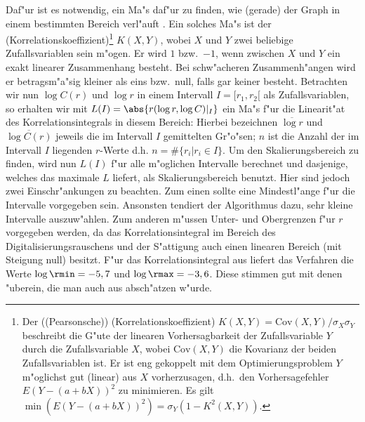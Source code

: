 Daf"ur ist es notwendig, ein Ma"s daf"ur zu finden, wie \naja(gerade) der Graph in einem
bestimmten Bereich verl"auft \cite{Raidl}. Ein solches Ma"s ist der 
\begriff(Korrelationskoeffizient)\footnote{Der (\begriff(Pearsonsche))
\begriff(Korrelationskoeffizient) $K(X,Y)=\mathrm{Cov}(X,Y)/\sigma_X \sigma_Y$ beschreibt die G"ute 
der linearen Vorhersagbarkeit der Zufallsvariable $Y$ durch die Zufallsvariable $X$, wobei 
$\mathrm{Cov}(X,Y)$ die Kovarianz der beiden Zufallsvariablen ist. Er ist 
eng gekoppelt mit dem Optimierungsproblem $Y$ m"oglichst gut (linear) aus $X$
vorherzusagen, d.h.\  den Vorhersagefehler $E(Y-(a+bX))^2$ zu minimieren. Es gilt
$\min(E(Y-(a+bX))^2) = \sigma_Y(1-K^2(X,Y))$.} 
$K(X,Y)$, wobei $X$ und $Y$ zwei beliebige Zufallsvariablen sein m"ogen. Er wird $1$ 
bzw.\  $-1$, wenn zwischen $X$ und $Y$ ein exakt linearer Zusammenhang
besteht. Bei schw"acheren Zusammenh"angen wird er betragsm"a"sig kleiner als eins bzw.\  null, falls 
gar keiner besteht. Betrachten wir nun $\log C(r)$ und $\log r$ in einem Intervall
$I=[r_1,r_2[$ als Zufallsvariablen, so erhalten wir mit $L(I)=\abs{ r(\log r, \log
C)\rvert_{I}}$ ein Ma"s f"ur die Linearit"at des Korrelationsintegrals in diesem
Bereich:
Hierbei bezeichnen $\overline{\log r}$ und $\overline{\log C(r)}$ jeweils die
im Intervall $I$ gemittelten Gr"o"sen; $n$ ist die Anzahl der im Intervall $I$ liegenden
$r$-Werte d.h. $n=\#\{r_i\vert r_i\in I\}$. Um den Skalierungsbereich zu finden, wird nun $L(I)$ 
f"ur alle m"oglichen Intervalle berechnet und dasjenige, welches das maximale $L$
liefert, als Skalierungsbereich benutzt. Hier sind jedoch zwei Einschr"ankungen zu
beachten. Zum einen sollte eine Mindestl"ange f"ur die Intervalle vorgegeben
sein. Ansonsten tendiert der Algorithmus dazu, sehr kleine Intervalle auszuw"ahlen. Zum
anderen m"ussen Unter- und Obergrenzen f"ur $r$ vorgegeben werden, da das
Korrelationsintegral im Bereich des Digitalisierungsrauschens und der S"attigung  auch
einen linearen Bereich (mit Steigung null) besitzt. F"ur das Korrelationsintegral aus  
liefert das Verfahren die Werte $\log \rmin = -5,7$ und $\log \rmax = -3,6$. Diese stimmen gut 
mit denen "uberein, die man auch aus  absch"atzen w"urde.

